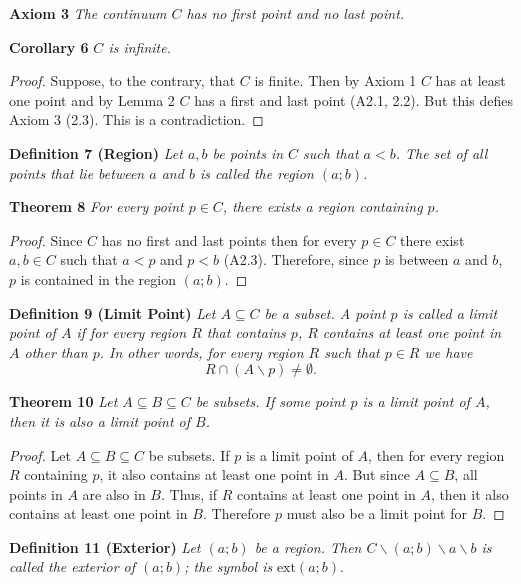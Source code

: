 \documentclass{article}
\begin{document}
\begin{flushleft}
\textbf{Axiom 3}
\textsl{The continuum $C$ has no first point and no last point.}\newline

\textbf{Corollary 6}
\textsl{$C$ is infinite.}
\begin{proof}
Suppose, to the contrary, that $C$ is finite. Then by Axiom 1 $C$ has at least one point and by Lemma 2 $C$ has a first and last point (A2.1, 2.2). But this defies Axiom 3 (2.3). This is a contradiction.
\end{proof}

\textbf{Definition 7 (Region)}
\textsl{Let $a,b$ be points in $C$ such that $a<b$. The set of all points that lie between $a$ and $b$ is called the region $(a;b)$.}\newline

\textbf{Theorem 8}
\textsl{For every point $p \in C$, there exists a region containing $p$.}
\begin{proof}
Since $C$ has no first and last points then for every $p \in C$ there exist $a,b \in C$ such that $a < p$ and $p < b$ (A2.3). Therefore, since $p$ is between $a$ and $b$, $p$ is contained in the region $(a;b)$.
\end{proof}

\textbf{Definition 9 (Limit Point)}
\textsl{Let $A \subseteq C$ be a subset. A point $p$ is called a limit point of $A$ if for every region $R$ that contains $p$, $R$ contains at least one point in $A$ other than $p$. In other words, for every region $R$ such that $p \in R$ we have
\[
R \cap (A \backslash p) \neq \emptyset.
\]}

\textbf{Theorem 10}
\textsl{Let $A \subseteq B \subseteq C$ be subsets. If some point $p$ is a limit point of $A$, then it is also a limit point of $B$.}
\begin{proof}
Let $A \subseteq B \subseteq C$ be subsets. If $p$ is a limit point of $A$, then for every region $R$ containing $p$, it also contains at least one point in $A$. But since $A \subseteq B$, all points in $A$ are also in $B$. Thus, if $R$ contains at least one point in $A$, then it also contains at least one point in $B$. Therefore $p$ must also be a limit point for $B$.
\end{proof}

\textbf{Definition 11 (Exterior)}
\textsl{Let $(a;b)$ be a region. Then $C \backslash (a;b) \backslash a \backslash b$ is called the exterior of $(a;b)$; the symbol is }$\text{ext}(a;b)$.\newline


\end{flushleft}
\end{document}
